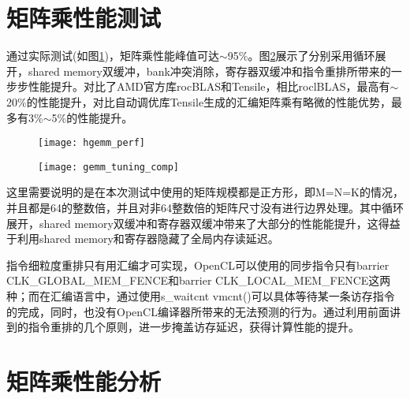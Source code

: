 \section{矩阵乘性能测试}
通过实际测试(如图\ref{fig:hgemm_perf})，矩阵乘性能峰值可达$\sim$95\%。图\ref{fig:gemm_tuning_comp}展示了分别采用循环展开，shared memory双缓冲，bank冲突消除，寄存器双缓冲和指令重排所带来的一步步性能提升。对比了AMD官方库rocBLAS和Tensile，相比roclBLAS，最高有$\sim$20\%的性能提升，对比自动调优库Tensile生成的汇编矩阵乘有略微的性能优势，最多有3\%$\sim$5\%的性能提升。
\begin{figure}[htbp]
	\centering
	\texttt{[image: hgemm\_perf]}
	\label{fig:hgemm_perf}
\end{figure}
\begin{figure}[htbp]
	\centering
	\texttt{[image: gemm\_tuning\_comp]}
	\label{fig:gemm_tuning_comp}
\end{figure}
这里需要说明的是在本次测试中使用的矩阵规模都是正方形，即M=N=K的情况，并且都是64的整数倍，并且对非64整数倍的矩阵尺寸没有进行边界处理。其中循环展开，shared memory双缓冲和寄存器双缓冲带来了大部分的性能能提升，这得益于利用shared memory和寄存器隐藏了全局内存读延迟。

指令细粒度重排只有用汇编才可实现，OpenCL可以使用的同步指令只有barrier CLK\_GLOBAL\_MEM\_FENCE和barrier CLK\_LOCAL\_MEM\_FENCE这两种；而在汇编语言中，通过使用s\_waitcnt vmcnt()可以具体等待某一条访存指令的完成，同时，也没有OpenCL编译器所带来的无法预测的行为。通过利用前面讲到的指令重排的几个原则，进一步掩盖访存延迟，获得计算性能的提升。


\section{矩阵乘性能分析}
